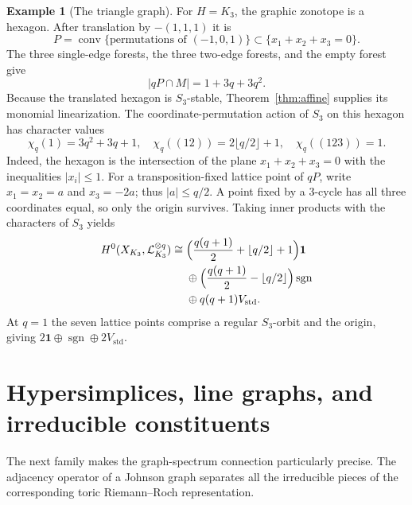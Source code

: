 \documentclass[12pt,letterpaper]{article}
\theoremstyle{definition}
\newtheorem{example}[theorem]{Example}
\theoremstyle{remark}
\numberwithin{equation}{section}
\newcommand{\LL}{\mathcal L}
\newcommand{\bfone}{\mathbf 1}
\begin{document}
\begin{example}[The triangle graph]\label{ex:K3}
For $H=K_3$, the graphic zonotope is a hexagon. After translation by $-(1,1,1)$ it is
\[
P=\operatorname{conv}\{\text{permutations of }(-1,0,1)\}
\subset\{x_1+x_2+x_3=0\}.
\]
The three single-edge forests, the three two-edge forests, and the empty forest give
\begin{equation}\label{eq:k3poly}
|qP\cap M|=1+3q+3q^2.
\end{equation}
Because the translated hexagon is $S_3$-stable, Theorem~\ref{thm:affine} supplies its monomial linearization. The coordinate-permutation action of $S_3$ on this hexagon has character values
\begin{equation}\label{eq:K3chars}
\chi_q(1)=3q^2+3q+1,\quad
\chi_q((12))=2\lfloor q/2\rfloor+1,\quad
\chi_q((123))=1.
\end{equation}
Indeed, the hexagon is the intersection of the plane $x_1+x_2+x_3=0$ with the inequalities $|x_i|\leq1$. For a transposition-fixed lattice point of $qP$, write $x_1=x_2=a$ and $x_3=-2a$; thus $|a|\leq q/2$. A point fixed by a $3$-cycle has all three coordinates equal, so only the origin survives. Taking inner products with the characters of $S_3$ yields
\begin{equation}\label{eq:k3reps}
\begin{split}
H^0(X_{K_3},\LL_{K_3}^{\otimes q})\cong{}&
\Bigl(\frac{q(q+1)}2+\lfloor q/2\rfloor+1\Bigr)\bfone\\
&\oplus\Bigl(\frac{q(q+1)}2-\lfloor q/2\rfloor\Bigr)\operatorname{sgn}\\
&\oplus q(q+1)V_{\mathrm{std}}.
\end{split}
\end{equation}
At $q=1$ the seven lattice points comprise a regular $S_3$-orbit and the origin, giving $2\bfone\oplus\operatorname{sgn}\oplus2V_{\mathrm{std}}$.
\end{example}

\section{Hypersimplices, line graphs, and irreducible constituents}\label{sec:johnson}
The next family makes the graph-spectrum connection particularly precise. The adjacency operator of a Johnson graph separates all the irreducible pieces of the corresponding toric Riemann--Roch representation.
\end{document}
